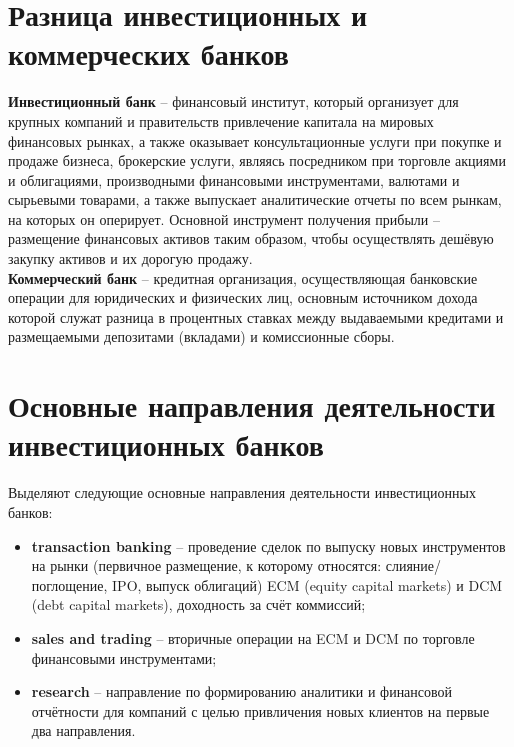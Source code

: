 \documentclass{article}
\begin{document}
\section{Разница инвестиционных и коммерческих банков}
\textbf{Инвестиционный банк} -- финансовый институт, который организует для крупных компаний и правительств привлечение капитала на мировых финансовых рынках, а также оказывает консультационные услуги при покупке и продаже бизнеса, брокерские услуги, являясь посредником при торговле акциями и облигациями, производными финансовыми инструментами, валютами и сырьевыми товарами, а также выпускает аналитические отчеты по всем рынкам, на которых он оперирует. Основной инструмент получения прибыли -- размещение финансовых активов таким образом, чтобы осуществлять дешёвую закупку активов и их дорогую продажу.\\
\textbf{Коммерческий банк} -- кредитная организация, осуществляющая банковские операции для юридических и физических лиц, основным источником дохода которой служат разница в процентных ставках между выдаваемыми кредитами и размещаемыми депозитами (вкладами) и комиссионные сборы.\\
\section{Основные направления деятельности инвестиционных банков}
Выделяют следующие основные направления деятельности инвестиционных банков:
\begin{itemize}
    \item \textbf{transaction banking} -- проведение сделок по выпуску новых инструментов на рынки (первичное размещение, к которому относятся: слияние/поглощение, IPO, выпуск облигаций) ECM (equity capital markets) и DCM (debt capital markets), доходность за счёт коммиссий;
    \item \textbf{sales and trading} -- вторичные операции на ECM и DCM по торговле финансовыми инструментами;
    \item \textbf{research} -- направление по формированию аналитики и финансовой отчётности для компаний с целью привличения новых клиентов на первые два направления.
\end{itemize}
\end{document}
